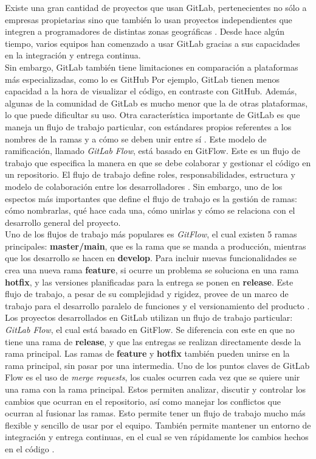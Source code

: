 \documentclass[runningheads]{llncs}
\begin{document}
Existe una gran cantidad de proyectos que usan GitLab, pertenecientes no sólo a empresas propietarias
sino que también lo usan proyectos independientes que integren a programadores de distintas zonas
geográficas \cite{safari2020structural}. Desde hace algún tiempo, varios equipos han comenzado a usar GitLab
gracias a sus capacidades en la integración y entrega continua.\\
Sin embargo, GitLab también tiene limitaciones en comparación a plataformas más especializadas, como lo es GitHub
Por ejemplo, GitLab tienen menos capacidad a la hora de visualizar el código, en contraste con GitHub.
Además, algunas de la comunidad de GitLab es mucho menor que la de otras plataformas, lo que puede dificultar su uso.
Otra característica importante de GitLab es que maneja un flujo de trabajo particular, con estándares propios referentes
a los nombres de la ramas y a cómo se deben unir entre sí \cite{devineni1version}. Este modelo de ramificación, llamado
\textit{GitLab Flow}, está basado en GitFlow. Este es un flujo de trabajo que especifica
la manera en que se debe colaborar y gestionar el código en un repositorio. El flujo de trabajo define roles, responsabilidades,
estructura y modelo de colaboración entre los desarrolladores \cite{uddin2023comparative}. Sin embargo, uno de los espectos
más importantes que define el flujo de trabajo es la gestión de ramas: cómo nombrarlas, qué hace cada una, cómo unirlas y
cómo se relaciona con el desarrollo general del proyecto.\\
Uno de los flujos de trabajo más populares es \textit{GitFlow}, el cual existen 5 ramas principales: \textbf{master/main}, que
es la rama que se manda a producción, mientras que los desarrollo se hacen en \textbf{develop}. Para incluir nuevas funcionalidades
se crea una nueva rama \textbf{feature}, si ocurre un problema se soluciona en una rama \textbf{hotfix}, y las versiones
planificadas para la entrega se ponen en \textbf{release}. Este flujo de trabajo, a pesar de su complejidad y rigidez,
provee de un marco de trabajo para el desarrollo paralelo de funciones y el versionamiento del producto \cite{devineni1version}.\\
Los proyectos desarrollados en GitLab utilizan un flujo de trabajo particular: \textit{GitLab Flow}, el cual está basado en GitFlow.
Se diferencia con este en que no tiene una rama de \textbf{release}, y que las entregas se realizan directamente desde la rama 
principal. Las ramas de \textbf{feature} y \textbf{hotfix} también pueden unirse en la rama principal, sin pasar por una intermedia.
Uno de los puntos claves de GitLab Flow es el uso de \textit{merge requests}, los cuales ocurren cada vez que se quiere unir una
rama con la rama principal. Estos permiten analizar, discutir y controlar los cambios que ocurran en el repositorio, así como manejar
los conflictos que ocurran al fusionar las ramas. Esto permite tener un flujo de trabajo mucho más flexible y sencillo de usar por
el equipo. También permite mantener un entorno de integración y entrega continuas, en el cual se ven rápidamente los cambios
hechos en el código \cite{devineni1version}.
\end{document}
